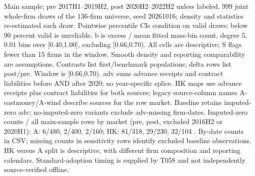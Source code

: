 \begin{threeparttable}
\begin{tablenotes}[flushleft]
\item[] Main sample; pre 2017H1--2019H2, post 2020H2--2022H2 unless labeled. 999 joint whole-firm draws of the 136-firm universe, seed 20261016; density and statistics re-estimated each draw. Pointwise percentile CIs condition on valid draws; below 90 percent valid is unreliable. b is excess / mean fitted mass-bin count, degree 5, 0.01 bins over [0.40,1.00], excluding [0.66,0.70). All cells are descriptive; S flags fewer than 15 firms in the window. Smooth density and reporting comparability are assumptions. Contrasts list first/benchmark populations; delta rows list post/pre. Window is [0.66,0.70). adv sums advance receipts and contract liabilities before AND after 2020; no year-specific splice. HK maps use advance receipts plus contract liabilities for both sources; legacy source-column names A-eastmoney/A-wind describe sources for the row market. Baseline retains imputed-zero adv; no-imputed-zero variants exclude adv-missing firm-dates. Imputed-zero counts / all main-sample rows by market (pre, post, excluded 2016H2 or 2020H1): A: 6/480, 2/400, 2/160; HK: 81/318, 29/230, 32/104 . By-date counts in CSV; missing counts in sensitivity rows identify excluded baseline observations. HK versus A split is descriptive, with different firm composition and reporting calendars. Standard-adoption timing is supplied by T058 and not independently source-verified offline.
\end{tablenotes}
\end{threeparttable}
\endgroup
\par\medskip
